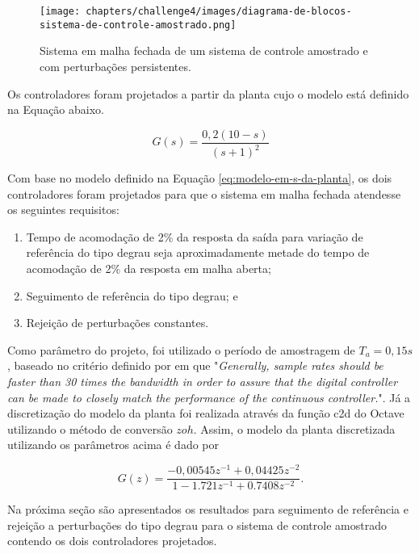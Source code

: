 \begin{figure}[ht!]
	\centering
	\caption{Sistema em malha fechada de um sistema de controle amostrado e com
    perturbações persistentes.}
	\label{fig:diagrama-de-blocos-malha-fechada}
	\texttt{[image: chapters/challenge4/images/diagrama-de-blocos-sistema-de-controle-amostrado.png]}
\end{figure}

Os controladores foram projetados a partir da planta cujo o modelo está definido
na Equação abaixo.

\begin{equation}
    \label{eq:modelo-em-s-da-planta}
    G(s) = \frac{0,2(10 - s)}{(s+1)^{2}}
\end{equation}

Com base no modelo definido na Equação \ref{eq:modelo-em-s-da-planta}, os dois
controladores foram projetados para que o sistema em malha fechada atendesse os
seguintes requisitos:

\begin{enumerate}
    \item Tempo de acomodação de 2\% da resposta da saída para variação de
    referência do tipo degrau seja aproximadamente metade do tempo de acomodação
    de 2\% da resposta em malha aberta;
    \item Seguimento de referência do tipo degrau; e
    \item Rejeição de perturbações constantes.
\end{enumerate}

Como parâmetro do projeto, foi utilizado o período de amostragem de $T_{a} =
0,15 s$, baseado no critério definido por \cite[p. 61]{Franklin1997} em que
"\textit{Generally, sample rates should be faster than 30 times the bandwidth in
order to assure that the digital controller can be made to closely match the
performance of the continuous controller.}". Já a discretização do modelo da
planta foi realizada através da função c2d do Octave utilizando o método de
conversão $zoh$. Assim, o modelo da planta discretizada utilizando os parâmetros
acima é dado por

\begin{equation}
    \label{eq:modelo-em-z-da-planta}
    G(z) = \frac{-0,00545z^{-1} + 0,04425z^{-2}}{1 - 1.721z^{-1} + 0.7408z^{-2}}.
\end{equation}

Na próxima seção são apresentados os resultados para seguimento de referência e
rejeição a perturbações do tipo degrau para o sistema de controle amostrado
contendo os dois controladores projetados.

